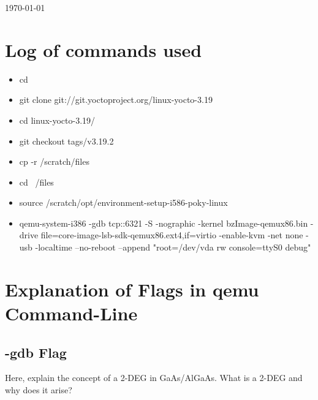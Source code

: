 \documentclass{article}
\begin{document}
\begin{titlepage}
{\large \today}\\[3cm] %




\vfill %



\end{titlepage}

\tableofcontents
\newpage

\section{Log of commands used}
\label{sec:introduction}

\begin{itemize}
\item cd ~
\item git clone git://git.yoctoproject.org/linux-yocto-3.19
\item cd linux-yocto-3.19/
\item git checkout tags/v3.19.2
\item cp -r /scratch/files ~
\item cd ~/files
\item source /scratch/opt/environment-setup-i586-poky-linux
\item qemu-system-i386 -gdb tcp::6321 -S -nographic -kernel bzImage-qemux86.bin -drive file=core-image-lsb-sdk-qemux86.ext4,if=virtio -enable-kvm -net none -usb -localtime --no-reboot --append "root=/dev/vda rw console=ttyS0 debug"
\end{itemize}

\section{Explanation of Flags in qemu Command-Line}
\label{sec:flags}

\subsection{-gdb Flag}
Here, explain the concept of a 2-DEG in GaAs/AlGaAs. What is a 2-DEG and why does it arise?
\end{document}
